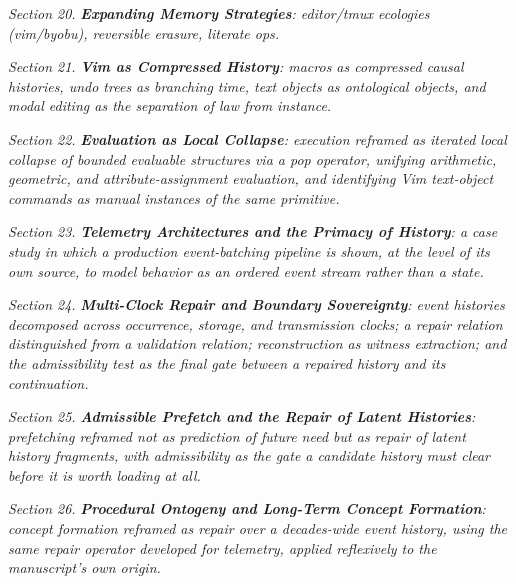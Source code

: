 \documentclass[12pt,a4paper]{article}
\theoremstyle{plain}
\theoremstyle{definition}
\theoremstyle{remark}
\begin{document}
\textit{Section 20.} \textit{\textbf{Expanding Memory Strategies}: editor/tmux ecologies (vim/byobu), reversible erasure, literate ops.}

\textit{Section 21.} \textit{\textbf{Vim as Compressed History}: macros as compressed causal histories, undo trees as branching time, text objects as ontological objects, and modal editing as the separation of law from instance.}

\textit{Section 22.} \textit{\textbf{Evaluation as Local Collapse}: execution reframed as iterated local collapse of bounded evaluable structures via a pop operator, unifying arithmetic, geometric, and attribute-assignment evaluation, and identifying Vim text-object commands as manual instances of the same primitive.}

\textit{Section 23.} \textit{\textbf{Telemetry Architectures and the Primacy of History}: a case study in which a production event-batching pipeline is shown, at the level of its own source, to model behavior as an ordered event stream rather than a state.}

\textit{Section 24.} \textit{\textbf{Multi-Clock Repair and Boundary Sovereignty}: event histories decomposed across occurrence, storage, and transmission clocks; a repair relation distinguished from a validation relation; reconstruction as witness extraction; and the admissibility test as the final gate between a repaired history and its continuation.}

\textit{Section 25.} \textit{\textbf{Admissible Prefetch and the Repair of Latent Histories}: prefetching reframed not as prediction of future need but as repair of latent history fragments, with admissibility as the gate a candidate history must clear before it is worth loading at all.}

\textit{Section 26.} \textit{\textbf{Procedural Ontogeny and Long-Term Concept Formation}: concept formation reframed as repair over a decades-wide event history, using the same repair operator developed for telemetry, applied reflexively to the manuscript's own origin.}
\end{document}
